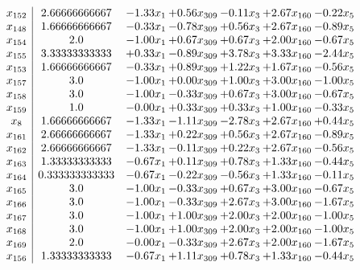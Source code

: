 \documentclass[8pt]{article}
\begin{document}
\[\begin{array}{c| c c@{\hskip 2pt} c@{\hskip 2pt} c@{\hskip 2pt} c@{\hskip 2pt} c@{\hskip 2pt} }
 x_{152}   &  2.66666666667 & -1.33 x_{1} & +  0.56 x_{309} & -0.11 x_{3} & +  2.67 x_{160} & -0.22 x_{5}\\
 x_{148}   &  1.66666666667 & -0.33 x_{1} & -0.78 x_{309} & +  0.56 x_{3} & +  2.67 x_{160} & -0.89 x_{5}\\
 x_{154}   &  2.0 & -1.00 x_{1} & +  0.67 x_{309} & +  0.67 x_{3} & +  2.00 x_{160} & -0.67 x_{5}\\
 x_{155}   &  3.33333333333 & +  0.33 x_{1} & -0.89 x_{309} & +  3.78 x_{3} & +  3.33 x_{160} & -2.44 x_{5}\\
 x_{153}   &  1.66666666667 & -0.33 x_{1} & +  0.89 x_{309} & +  1.22 x_{3} & +  1.67 x_{160} & -0.56 x_{5}\\
 x_{157}   &  3.0 & -1.00 x_{1} & +  0.00 x_{309} & +  1.00 x_{3} & +  3.00 x_{160} & -1.00 x_{5}\\
 x_{158}   &  3.0 & -1.00 x_{1} & -0.33 x_{309} & +  0.67 x_{3} & +  3.00 x_{160} & -0.67 x_{5}\\
 x_{159}   &  1.0 & -0.00 x_{1} & +  0.33 x_{309} & +  0.33 x_{3} & +  1.00 x_{160} & -0.33 x_{5}\\
 x_{8}   &  1.66666666667 & -1.33 x_{1} & -1.11 x_{309} & -2.78 x_{3} & +  2.67 x_{160} & +  0.44 x_{5}\\
 x_{161}   &  2.66666666667 & -1.33 x_{1} & +  0.22 x_{309} & +  0.56 x_{3} & +  2.67 x_{160} & -0.89 x_{5}\\
 x_{162}   &  2.66666666667 & -1.33 x_{1} & -0.11 x_{309} & +  0.22 x_{3} & +  2.67 x_{160} & -0.56 x_{5}\\
 x_{163}   &  1.33333333333 & -0.67 x_{1} & +  0.11 x_{309} & +  0.78 x_{3} & +  1.33 x_{160} & -0.44 x_{5}\\
 x_{164}   &  0.333333333333 & -0.67 x_{1} & -0.22 x_{309} & -0.56 x_{3} & +  1.33 x_{160} & -0.11 x_{5}\\
 x_{165}   &  3.0 & -1.00 x_{1} & -0.33 x_{309} & +  0.67 x_{3} & +  3.00 x_{160} & -0.67 x_{5}\\
 x_{166}   &  3.0 & -1.00 x_{1} & -0.33 x_{309} & +  2.67 x_{3} & +  3.00 x_{160} & -1.67 x_{5}\\
 x_{167}   &  3.0 & -1.00 x_{1} & +  1.00 x_{309} & +  2.00 x_{3} & +  2.00 x_{160} & -1.00 x_{5}\\
 x_{168}   &  3.0 & -1.00 x_{1} & +  1.00 x_{309} & +  2.00 x_{3} & +  2.00 x_{160} & -1.00 x_{5}\\
 x_{169}   &  2.0 & -0.00 x_{1} & -0.33 x_{309} & +  2.67 x_{3} & +  2.00 x_{160} & -1.67 x_{5}\\
 x_{156}   &  1.33333333333 & -0.67 x_{1} & +  1.11 x_{309} & +  0.78 x_{3} & +  1.33 x_{160} & -0.44 x_{5}\\

\end{array}\]
\end{document}
